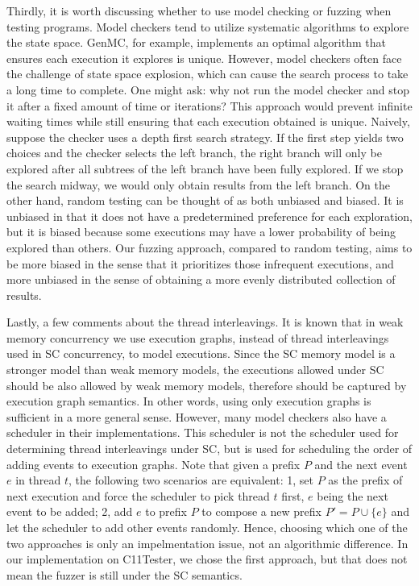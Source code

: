Thirdly, it is worth discussing whether to use model checking or fuzzing when testing programs. Model checkers tend to utilize systematic algorithms to explore the state space. GenMC, for example, implements an optimal algorithm that ensures each execution it explores is unique. However, model checkers often face the challenge of state space explosion, which can cause the search process to take a long time to complete. One might ask: why not run the model checker and stop it after a fixed amount of time or iterations? This approach would prevent infinite waiting times while still ensuring that each execution obtained is unique.
Naively, suppose the checker uses a depth first search strategy. If the first step yields two choices and the checker selects the left branch, the right branch will only be explored after all subtrees of the left branch have been fully explored. If we stop the search midway, we would only obtain results from the left branch. On the other hand, random testing can be thought of as both unbiased and biased. It is unbiased in that it does not have a predetermined preference for each exploration, but it is biased because some executions may have a lower probability of being explored than others. Our fuzzing approach, compared to random testing, aims to be more biased in the sense that it prioritizes those infrequent executions, and more unbiased in the sense of obtaining a more evenly distributed collection of results.



Lastly, a few comments about the thread interleavings. It is known that in weak memory concurrency we use execution graphs, instead of thread interleavings used in SC concurrency, to model executions. Since the SC memory model is a stronger model than weak memory models, the executions allowed under SC should be also allowed by weak memory models, therefore should be captured by execution graph semantics. In other words, using only execution graphs is sufficient in a more general sense. However, many model checkers also have a scheduler in their implementations. This scheduler is not the scheduler used for determining thread interleavings under SC, but is used for scheduling the order of adding events to execution graphs. Note that given a prefix $P$ and the next event $e$ in thread $t$, the following two scenarios are equivalent: 1, set $P$ as the prefix of next execution and force the scheduler to pick thread $t$ first, $e$ being the next event to be added; 2, add $e$ to prefix $P$ to compose a new prefix $P' = P \cup \{e\}$ and let the scheduler to add other events randomly. Hence, choosing which one of the two approaches is only an impelmentation issue, not an algorithmic difference. In our implementation on C11Tester, we chose the first approach, but that does not mean the fuzzer is still under the SC semantics.


